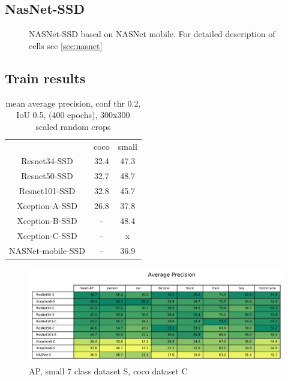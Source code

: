 \subsection{NasNet-SSD}

\begin{figure}
    \centering
    \nasnetSSD
    \caption[NASNet-SSD]%
    {NASNet-SSD based on NASNet mobile. For detailed description of cells see \cref{sec:nasnet}}
    \label{fig:nasnetSSD}
\end{figure}


\subsection{Train results}
\begin{table}
    \begin{tabular}{c|c|c}
                            & coco      & small \\
        Resnet34-SSD        & 32.4      & 47.3  \\
        Resnet50-SSD        & 32.7      & 48.7  \\
        Resnet101-SSD       & 32.8      & 45.7  \\
        Xception-A-SSD      & 26.8      & 37.8  \\
        Xception-B-SSD      & -         & 48.4  \\
        Xception-C-SSD      & -         & x     \\
        NASNet-mobile-SSD   & -         & 36.9  \\
    \end{tabular}
    \caption{mean average precision, conf thr 0.2, IoU 0.5,  (400 epochs), 300x300 scaled random crops}
    \label{tab:map}
\end{table}

\begin{figure}
    \centering
    \includegraphics[width=\textwidth]{img/ap}
    \caption{AP, small 7 class dataset S, coco dataset C}
    \label{fig:ap}
\end{figure}


